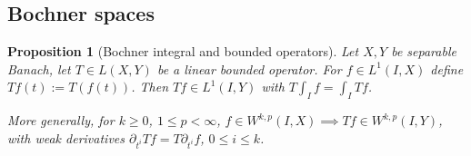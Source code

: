 \documentclass[english,a4paper,9pt,oneside]{scrbook}	%
\theoremstyle{break}
\newtheorem{prop}[equation]{Proposition}
\theoremstyle{remark}
\newcommand{\ds}{\displaystyle}
\newcommand{\cc}{\subset\subset}
\begin{document}
\begin{appendices}
%
%
%
%
%


\section{Bochner spaces}


\begin{prop}[Bochner integral and bounded operators]
\label{lemma:bochner_Hk_map}
Let $X,Y$ be separable Banach, let $T \in L(X,Y)$ be a linear bounded operator. For $f \in L^1(I,X)$ define $Tf (t):= T(f(t))$. Then $Tf \in L^1(I,Y)$ with $T\int_I f = \int_I Tf$.

More generally, for $k\geq 0$, $1\leq p < \infty$, $f \in W^{k,p}(I,X)\implies Tf \in W^{k,p}(I,Y)$, with weak derivatives $\partial_{t^i}Tf = T\partial_{t^i}f$, $0\leq i \leq k$.


\end{prop}
\end{appendices}
\end{document}
